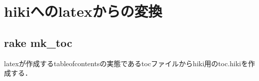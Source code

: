 \section{hikiへのlatexからの変換}
\subsection{rake mk\_toc}
latexが作成するtableofcontentsの実態であるtocファイルからhiki用のtoc.hikiを作成する．

